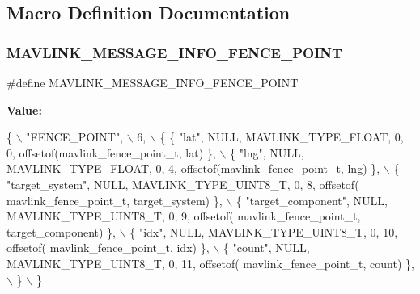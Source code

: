 \subsection{Macro Definition Documentation}
\mbox{\label{mavlink__msg__fence__point_8h_aa0a291fd78934e75661008a6852afc19}} 
\subsubsection{M\+A\+V\+L\+I\+N\+K\+\_\+\+M\+E\+S\+S\+A\+G\+E\+\_\+\+I\+N\+F\+O\+\_\+\+F\+E\+N\+C\+E\+\_\+\+P\+O\+I\+NT}
{\footnotesize\ttfamily \#define M\+A\+V\+L\+I\+N\+K\+\_\+\+M\+E\+S\+S\+A\+G\+E\+\_\+\+I\+N\+F\+O\+\_\+\+F\+E\+N\+C\+E\+\_\+\+P\+O\+I\+NT}

{\bfseries Value\+:}
\begin{DoxyCode}
\{ \(\backslash\)
    \textcolor{stringliteral}{"FENCE\_POINT"}, \(\backslash\)
    6, \(\backslash\)
    \{  \{ \textcolor{stringliteral}{"lat"}, NULL, MAVLINK_TYPE_FLOAT, 0, 0, offsetof(mavlink_fence_point_t, lat) \}, \(\backslash\)
         \{ \textcolor{stringliteral}{"lng"}, NULL, MAVLINK_TYPE_FLOAT, 0, 4, offsetof(mavlink_fence_point_t, lng) \}, \(\backslash\)
         \{ \textcolor{stringliteral}{"target\_system"}, NULL, MAVLINK_TYPE_UINT8_T, 0, 8, offsetof(
      mavlink_fence_point_t, target\_system) \}, \(\backslash\)
         \{ \textcolor{stringliteral}{"target\_component"}, NULL, MAVLINK_TYPE_UINT8_T, 0, 9, offsetof(
      mavlink_fence_point_t, target\_component) \}, \(\backslash\)
         \{ \textcolor{stringliteral}{"idx"}, NULL, MAVLINK_TYPE_UINT8_T, 0, 10, offsetof(
      mavlink_fence_point_t, idx) \}, \(\backslash\)
         \{ \textcolor{stringliteral}{"count"}, NULL, MAVLINK_TYPE_UINT8_T, 0, 11, offsetof(
      mavlink_fence_point_t, count) \}, \(\backslash\)
         \} \(\backslash\)
\}
\end{DoxyCode}
\mbox{\label{mavlink__msg__fence__point_8h_a07d42bc16810533a9fb59b37b8f4dc66}} 
